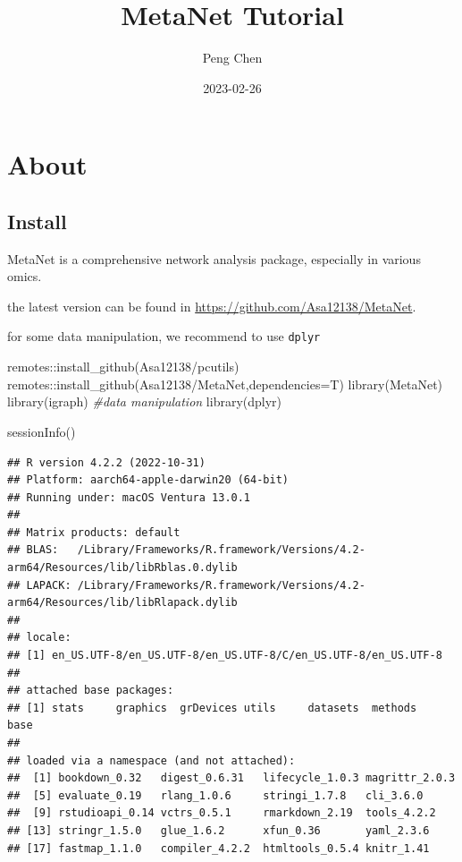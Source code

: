 \documentclass[
]{book}
\title{MetaNet Tutorial}
\author{Peng Chen}
\date{2023-02-26}
\newenvironment{Shaded}{\begin{snugshade}}{\end{snugshade}}
\newcommand{\AttributeTok}[1]{\textcolor[rgb]{0.77,0.63,0.00}{#1}}
\newcommand{\CommentTok}[1]{\textcolor[rgb]{0.56,0.35,0.01}{\textit{#1}}}
\newcommand{\FunctionTok}[1]{\textcolor[rgb]{0.00,0.00,0.00}{#1}}
\newcommand{\NormalTok}[1]{#1}
\newcommand{\SpecialCharTok}[1]{\textcolor[rgb]{0.00,0.00,0.00}{#1}}
\newcommand{\StringTok}[1]{\textcolor[rgb]{0.31,0.60,0.02}{#1}}
\begin{document}
\maketitle

{
\setcounter{tocdepth}{1}
\tableofcontents
}
\hypertarget{about}{%
\chapter{About}\label{about}}

\hypertarget{install}{%
\section{Install}\label{install}}

MetaNet is a comprehensive network analysis package, especially in various omics.

the latest version can be found in \url{https://github.com/Asa12138/MetaNet}.

for some data manipulation, we recommend to use \texttt{dplyr}

\begin{Shaded}
\begin{Highlighting}[]
\NormalTok{remotes}\SpecialCharTok{::}\FunctionTok{install\_github}\NormalTok{(}\StringTok{\textquotesingle{}Asa12138/pcutils\textquotesingle{}}\NormalTok{)}
\NormalTok{remotes}\SpecialCharTok{::}\FunctionTok{install\_github}\NormalTok{(}\StringTok{\textquotesingle{}Asa12138/MetaNet\textquotesingle{}}\NormalTok{,}\AttributeTok{dependencies=}\NormalTok{T)}
\FunctionTok{library}\NormalTok{(MetaNet)}
\FunctionTok{library}\NormalTok{(igraph)}
\CommentTok{\#data manipulation}
\FunctionTok{library}\NormalTok{(dplyr)}
\end{Highlighting}
\end{Shaded}

\begin{Shaded}
\begin{Highlighting}[]
\FunctionTok{sessionInfo}\NormalTok{()}
\end{Highlighting}
\end{Shaded}

\begin{verbatim}
## R version 4.2.2 (2022-10-31)
## Platform: aarch64-apple-darwin20 (64-bit)
## Running under: macOS Ventura 13.0.1
## 
## Matrix products: default
## BLAS:   /Library/Frameworks/R.framework/Versions/4.2-arm64/Resources/lib/libRblas.0.dylib
## LAPACK: /Library/Frameworks/R.framework/Versions/4.2-arm64/Resources/lib/libRlapack.dylib
## 
## locale:
## [1] en_US.UTF-8/en_US.UTF-8/en_US.UTF-8/C/en_US.UTF-8/en_US.UTF-8
## 
## attached base packages:
## [1] stats     graphics  grDevices utils     datasets  methods   base     
## 
## loaded via a namespace (and not attached):
##  [1] bookdown_0.32   digest_0.6.31   lifecycle_1.0.3 magrittr_2.0.3 
##  [5] evaluate_0.19   rlang_1.0.6     stringi_1.7.8   cli_3.6.0      
##  [9] rstudioapi_0.14 vctrs_0.5.1     rmarkdown_2.19  tools_4.2.2    
## [13] stringr_1.5.0   glue_1.6.2      xfun_0.36       yaml_2.3.6     
## [17] fastmap_1.1.0   compiler_4.2.2  htmltools_0.5.4 knitr_1.41
\end{verbatim}
\end{document}
